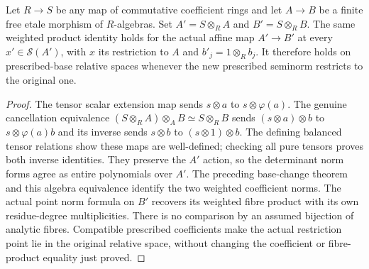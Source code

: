 \begin{theorem}
\label{spectrum:etale-norm-products-scalar-extension}
\leanok
{}
Let $R\to S$ be any map of commutative coefficient rings and let
$A\to B$ be a finite free etale morphism of $R$-algebras. Set
$A'=S\otimes_R A$ and $B'=S\otimes_R B$. The same weighted product
identity holds for the actual affine map $A'\to B'$ at every
$x'\in\mathcal S(A')$, with $x$ its restriction to $A$ and $b'_j=1\otimes_R b_j$.
It therefore holds on prescribed-base relative spaces whenever the
new prescribed seminorm restricts to the original one.
\end{theorem}
\begin{proof}
The tensor scalar extension map sends $s\otimes a$ to
$s\otimes \varphi(a)$. The genuine cancellation equivalence
$(S\otimes_R A)\otimes_A B\simeq S\otimes_R B$ sends
$(s\otimes a)\otimes b$ to $s\otimes \varphi(a)b$ and its inverse
sends $s\otimes b$ to $(s\otimes1)\otimes b$.
The defining balanced tensor relations show these maps are well-defined;
checking all pure tensors proves both inverse identities. They preserve
the $A'$ action, so the determinant norm forms agree as entire
polynomials over $A'$. The preceding base-change theorem and this
algebra equivalence identify the two weighted coefficient norms.
The actual point norm formula on $B'$ recovers its weighted fibre
product with its own residue-degree multiplicities. There is no
comparison by an assumed bijection of analytic fibres.
Compatible prescribed coefficients make the actual restriction point
lie in the original relative space, without changing the coefficient
or fibre-product equality just proved.
\end{proof}
